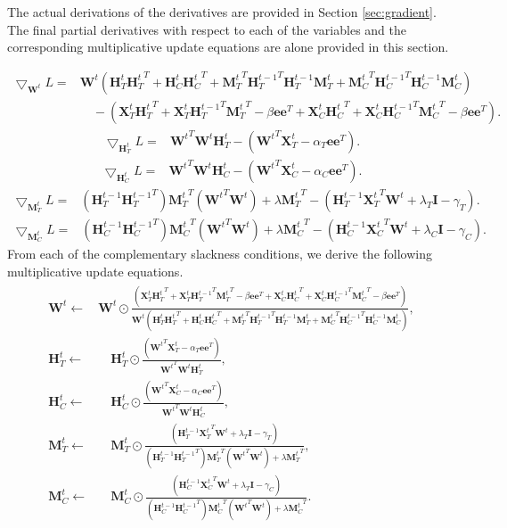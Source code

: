 \documentclass[a4paper,10pt]{article}
\newcommand{\I}{\mathcal{I}}
\newcommand{\W}{\textbf{W}^t}
\newcommand{\HT}{\textbf{H}^t_T}
\newcommand{\HC}{\textbf{H}^t_C}
\newcommand{\MT}{\textbf{M}^t_T}
\newcommand{\MC}{\textbf{M}^t_C}
\newcommand{\HTtt}{\textbf{H}^{t-1}_T}
\newcommand{\HCtt}{\textbf{H}^{t-1}_C}
\newcommand{\XT}{\textbf{X}^t_T}
\newcommand{\XC}{\textbf{X}^t_C}
\renewcommand{\I}{\textbf{I}}
\newcommand{\0}{\textbf{0}}
\newcommand{\e}{\textbf{e}}
\begin{document}
The actual derivations of the derivatives are provided in Section \ref{sec:gradient}.  The final partial derivatives
with respect to each of the variables and the corresponding multiplicative update equations are alone provided
in this section.

\begin{equation}
\begin{split}
\bigtriangledown_{\W}L = & \W(\HT{\HT}^{T} + \HC{\HC}^{T} + {\MT}^{T}{\HTtt}^{T}\HTtt\MT + {\MC}^{T}{\HCtt}^{T}\HCtt\MC) \\
	&\quad - (\XT{\HT}^{T}+\XT{\HTtt}^{T}{\MT}^{T} - \beta\e{\e}^{T} + \XC{\HC}^{T}+\XC{\HCtt}^{T}{\MC}^{T} - \beta\e{\e}^{T}).
\end{split}
\end{equation}
\begin{equation}
\begin{split}
\bigtriangledown_{\HT}L = & {\W}^{T}\W\HT - ({\W}^{T}\XT-\alpha_T\e{\e}^{T}).
\end{split}
\end{equation}
\begin{equation}
\begin{split}
\bigtriangledown_{\HC}L = & {\W}^{T}\W\HC - ({\W}^{T}\XC-\alpha_C\e{\e}^{T}).
\end{split}
\end{equation}
\begin{equation}
\begin{split}
\bigtriangledown_{\MT}L = &  (\HTtt{\HTtt}^{T}){\MT}^{T}({\W}^{T}\W) + \lambda {\MT}^{T} - (\HTtt{\XT}^{T}\W+\lambda_T\I - \gamma_T).
\end{split}
\end{equation}
\begin{equation}
\begin{split}
\bigtriangledown_{\MC}L = &  (\HCtt{\HCtt}^{T}){\MC}^{T}({\W}^{T}\W) + \lambda {\MC}^{T} - (\HCtt{\XC}^{T}\W+\lambda_C\I - \gamma_C).
\end{split}
\end{equation}
From each of the complementary slackness conditions, we derive the following multiplicative update 
equations.
\begin{eqnarray}
\label{eq:updates}
\begin{split}
\W \gets & \W \odot \frac{(\XT{\HT}^{T}+\XT{\HTtt}^{T}{\MT}^{T} - \beta\e{\e}^{T} + \XC{\HC}^{T}+\XC{\HCtt}^{T}{\MC}^{T} - \beta\e{\e}^{T})}{\W(\HT{\HT}^{T} + \HC{\HC}^{T} + {\MT}^{T}{\HTtt}^{T}\HTtt\MT + {\MC}^{T}{\HCtt}^{T}\HCtt\MC)}, \\
\HT \gets &\quad \HT \odot \frac{({\W}^{T}\XT-\alpha_T\e{\e}^{T})}{{\W}^{T}\W\HT}, \\
\HC \gets &\quad \HC \odot \frac{({\W}^{T}\XC-\alpha_C\e{\e}^{T})}{{\W}^{T}\W\HC}, \\
\MT \gets &\quad \MT \odot \frac{(\HTtt{\XT}^{T}\W+\lambda_T\I - \gamma_T)}{(\HTtt{\HTtt}^{T}){\MT}^{T}({\W}^{T}\W) + \lambda {\MT}^{T}}, \\
\MC \gets &\quad \MC \odot \frac{(\HCtt{\XC}^{T}\W+\lambda_T\I - \gamma_C)}{(\HCtt{\HCtt}^{T}){\MC}^{T}({\W}^{T}\W) + \lambda {\MC}^{T}}.
\end{split}
\end{eqnarray}
\end{document}
